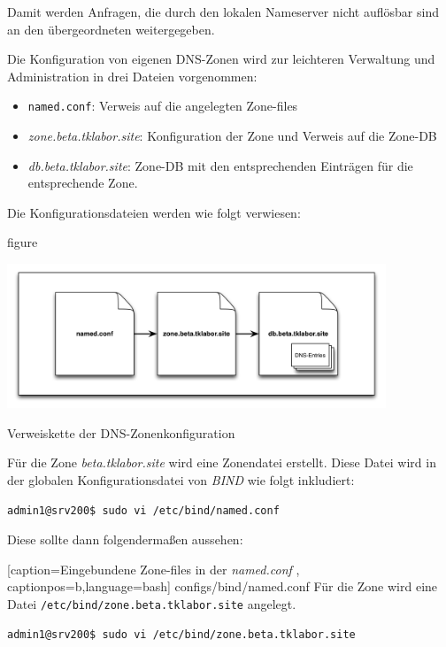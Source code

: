 Damit werden Anfragen, die durch den lokalen Nameserver nicht auflösbar sind an den übergeordneten weitergegeben.

Die Konfiguration von eigenen DNS-Zonen wird zur leichteren Verwaltung und
Administration in drei Dateien vorgenommen:
\begin{itemize}
  \item \texttt{named.conf}: Verweis auf die angelegten Zone-files
  \item \textit{zone.beta.tklabor.site}: Konfiguration der Zone und Verweis auf
  die Zone-DB
  \item \textit{db.beta.tklabor.site}: Zone-DB mit den entsprechenden Einträgen
  für die entsprechende Zone.
\end{itemize}

Die Konfigurationsdateien werden wie folgt verwiesen:

\begin{nofloat}{figure}
	\begin{center}
		\includegraphics[width=0.85\textwidth]{images/dns-files.png}
	\end{center}
	\caption{Verweiskette der DNS-Zonenkonfiguration}
	\label{fig:bind-config-chain}
\end{nofloat}

Für die Zone \textit{beta.tklabor.site} wird eine Zonendatei erstellt. Diese
Datei wird in der globalen Konfigurationsdatei von \textit{BIND} wie folgt
inkludiert:

\begin{lstlisting}
admin1@srv200$ sudo vi /etc/bind/named.conf
\end{lstlisting}
Diese sollte dann folgendermaßen aussehen:

    [caption={Eingebundene Zone-files in der \textit{named.conf}}
       \label{lst:named.conf},
       captionpos=b,language=bash]
{configs/bind/named.conf}
Für die Zone wird eine Datei \texttt{/etc/bind/zone.beta.tklabor.site}
angelegt.
\begin{lstlisting}
admin1@srv200$ sudo vi /etc/bind/zone.beta.tklabor.site
\end{lstlisting}

